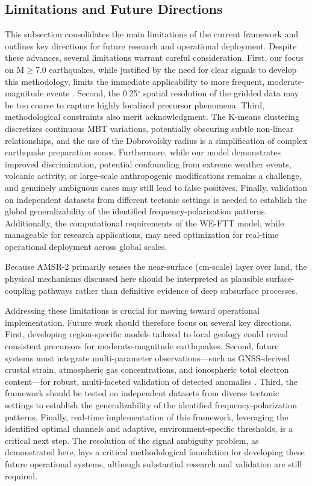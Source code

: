 \documentclass[preprint,review,12pt,authoryear]{elsarticle}
\begin{document}
\subsection{Limitations and Future Directions}\label{sec:discuss_limitations}
This subsection consolidates the main limitations of the current framework and outlines key directions for future research and operational deployment. Despite these advances, several limitations warrant careful consideration. First, our focus on M$\ge$7.0 earthquakes, while justified by the need for clear signals to develop this methodology, limits the immediate applicability to more frequent, moderate-magnitude events \citep{jingLandAtmosphereMeteorological2019}. Second, the 0.25$^{\circ}$ spatial resolution of the gridded data may be too coarse to capture highly localized precursor phenomena. Third, methodological constraints also merit acknowledgment. The K-means clustering discretizes continuous MBT variations, potentially obscuring subtle non-linear relationships, and the use of the Dobrovolsky radius is a simplification of complex earthquake preparation zones. Furthermore, while our model demonstrates improved discrimination, potential confounding from extreme weather events, volcanic activity, or large-scale anthropogenic modifications remains a challenge, and genuinely ambiguous cases may still lead to false positives. Finally, validation on independent datasets from different tectonic settings is needed to establish the global generalizability of the identified frequency-polarization patterns. Additionally, the computational requirements of the WE-FTT model, while manageable for research applications, may need optimization for real-time operational deployment across global scales.

Because AMSR-2 primarily senses the near-surface (cm-scale) layer over land, the physical mechanisms discussed here should be interpreted as plausible surface-coupling pathways rather than definitive evidence of deep subsurface processes.


Addressing these limitations is crucial for moving toward operational implementation. Future work should therefore focus on several key directions. First, developing region-specific models tailored to local geology could reveal consistent precursors for moderate-magnitude earthquakes. Second, future systems must integrate multi-parameter observations---such as GNSS-derived crustal strain, atmospheric gas concentrations, and ionospheric total electron content---for robust, multi-faceted validation of detected anomalies \citep{hayakawaIntegratedAnalysisMultiParameter2024}. Third, the framework should be tested on independent datasets from diverse tectonic settings to establish the generalizability of the identified frequency-polarization patterns. Finally, real-time implementation of this framework, leveraging the identified optimal channels and adaptive, environment-specific thresholds, is a critical next step. The resolution of the signal ambiguity problem, as demonstrated here, lays a critical methodological foundation for developing these future operational systems, although substantial research and validation are still required.
\end{document}
